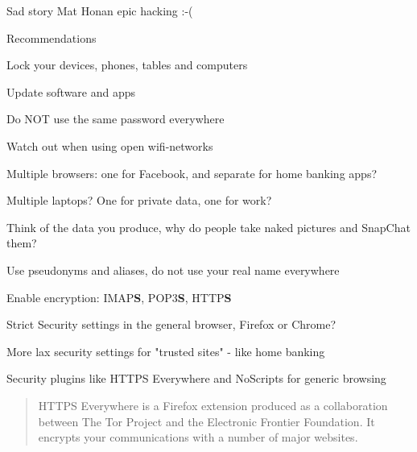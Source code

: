 \documentclass[20pt,landscape,a4paper,footrule]{foils}
\begin{document}
Sad story Mat Honan epic hacking :-(\\ {\small{}}



Recommendations 
\begin{list2}
\item Lock your devices, phones, tables and computers
\item Update software and apps
\item Do NOT use the same password everywhere
\item Watch out when using open wifi-networks
\item Multiple browsers: one for Facebook, and separate for home banking apps?
\item Multiple laptops? One for private data, one for work?
\item Think of the data you produce, why do people take naked pictures and SnapChat them?
\item Use pseudonyms and aliases, do not use your real name everywhere
\item Enable encryption: IMAP{\bf S}, POP3{\bf S},
  HTTP{\bf S} \\
\end{list2}




\begin{list2}
\item Strict Security settings in the general browser, Firefox or Chrome?
\item More lax security settings for "trusted sites" - like home banking
\item Security plugins like HTTPS Everywhere and NoScripts for generic browsing
\end{list2}


\begin{quote}
HTTPS Everywhere is a Firefox extension produced as a collaboration between The Tor Project and the Electronic Frontier Foundation. It encrypts your communications with a number of major websites.
\end{quote}

\centerline{}
\end{document}
